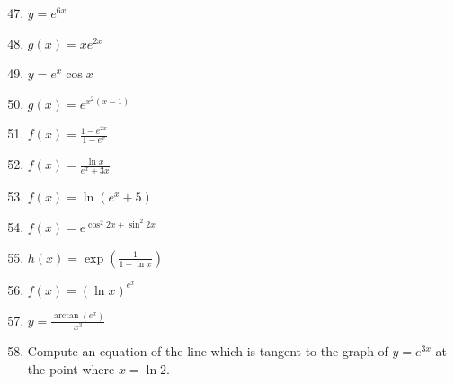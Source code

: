 \documentclass[12pt]{article}
\newif\ifans
\begin{document}

\begin{enumerate}
\setcounter{enumi}{46}

\item $y = e^{6x}$ 

\ifans{\fbox{$6e^{6x}$}} \fi

\item $g(x) = xe^{2x}$ 

\ifans{\fbox{$e^{2x}+2xe^{2x}$}} \fi

\item $y = e^x\cos {x}$ 

\ifans{\fbox{$-e^{x}\sin{x}+e^{x}\cos{x}$}} \fi

\item $g(x) = e^{x^2(x-1)}$ 

\ifans{\fbox{$e^{x^2(x-1)}(3x^2-2x)$}} \fi

\item $f(x) = \frac{1-e^{2x}}{1-e^x}$ 

\ifans{\fbox{$e^x$}} \fi

\item $f(x) = \frac{\ln{x}}{e^{x}+3x}$ 

\ifans{\fbox{$\frac{e^x+3x-x\ln{(x)}e^x-3x\ln{(x)}}{x(e^x+3x)^2}$}} \fi

\item $f(x) = \ln{(e^{x}+5)}$ 

\ifans{\fbox{$\frac{e^{x}}{e^{x}+5}$}} \fi

\item $f(x) = e^{\cos^2{2x}+\sin^2{2x}}$ 

\ifans{\fbox{0}} \fi

\item $h(x) = \exp{\left(\frac{1}{1-\ln x}\right)}$ 

\ifans{\fbox{$\frac{1}{x(1-\ln{x})^2}\exp{\left(\frac{1}{1-\ln x}\right)}$}} \fi

\item $f(x) = (\ln{x})^{e^{x}}$ 

\ifans{\fbox{$(\ln{x})^{e^{x}}\left(\frac{e^{x}}{x\ln{x}}+e^{x}\ln{(\ln{x})}\right)$}} \fi

\item $y = \frac{\arctan{(e^x)}}{x^3}$ 

\ifans{\fbox{$\frac{xe^{x}-3\tan^{-1}{(e^x)}-3e^{2x}\tan^{-1}{(e^x)}}{x^4(1+e^{2x})}$}} \fi

\item Compute an equation of the line which is tangent to the graph of $y=e^{3x}$ at the point where $x=\ln2$.


\end{enumerate}
\end{document}
